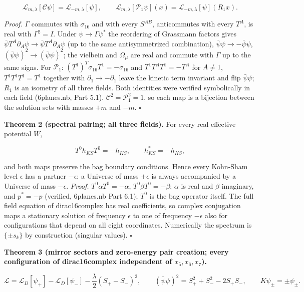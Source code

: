 \documentclass[10pt]{article}
\makeatletter
\newcommand\keepnext{\par\nopagebreak\@nobreaktrue\everypar{\@nobreakfalse\everypar{}}}
\makeatother
\begin{document}
\[
\mathcal L_{m,\lambda}[\mathcal C\psi] = \mathcal L_{-m,\lambda}[\psi],\qquad \mathcal L_{m,\lambda}[\mathcal P_1\psi](x) = \mathcal L_{-m,\lambda}[\psi](R_1x).
\]

\emph{Proof.} $\Gamma$ commutes with $\sigma_{16}$ and with every $S^{AB}$, anticommutes with every $T^A$, is real with $\Gamma^2 = I$. Under $\psi\to\Gamma\psi^*$ the reordering of Grassmann factors gives $\bar\psi T^A\partial_A\psi \to \bar\psi T^A\partial_A\psi$ (up to the same antisymmetrized combination), $\bar\psi\psi\to-\bar\psi\psi$, $(\bar\psi\psi)^2\to(\bar\psi\psi)^2$; the vielbein and $\Omega_\mu$ are real and commute with $\Gamma$ up to the same signs. For $\mathcal P_1$: $(T^1)^T\sigma_{16}T^1 = -\sigma_{16}$ and $T^1T^AT^1 = -T^A$ for $A\neq1$, $T^1T^1T^1 = T^1$ together with $\partial_1\to-\partial_1$ leave the kinetic term invariant and flip $\bar\psi\psi$; $R_1$ is an isometry of all three fields. Both identities were verified symbolically in each field (6planes.nb, Part 5.1). $\mathcal C^2 = \mathcal P_1^2 = 1$, so each map is a bijection between the solution sets with masses $+m$ and $-m$. $\square$


\textbf{Theorem 2 (spectral pairing; all three fields).} For every real effective potential $W$,\keepnext


\[
T^0h_{KS}T^0 = -h_{KS},\qquad h_{KS}^* = -h_{KS},
\]

and both maps preserve the bag boundary conditions. Hence every Kohn-Sham level $\epsilon$ has a partner $-\epsilon$: a Universe of mass $+\epsilon$ is always accompanied by a Universe of mass $-\epsilon$. \emph{Proof.} $T^0\alpha T^0 = -\alpha$, $T^0\beta T^0 = -\beta$; $\alpha$ is real and $\beta$ imaginary, and $p^* = -p$ (verified, 6planes.nb Part 6.1); $T^0$ is the bag operator itself. The full field equation of dirac16complex has real coefficients, so complex conjugation maps a stationary solution of frequency $\epsilon$ to one of frequency $-\epsilon$ also for configurations that depend on all eight coordinates. Numerically the spectrum is $\{\pm s_k\}$ by construction (singular values). $\square$


\textbf{Theorem 3 (mirror sectors and zero-energy pair creation; every configuration of dirac16complex independent of $x_5,x_6,x_7$).}\keepnext


\[
\mathcal L = \mathcal L_D[\psi_+] - \mathcal L_D[\psi_-] - \frac\lambda2(S_+ - S_-)^2,\qquad (\bar\psi\psi)^2 = S_+^2 + S_-^2 - 2S_+S_-,\qquad K\psi_\pm = \pm\psi_\pm .
\]
\end{document}
